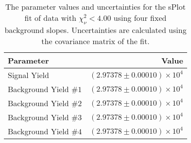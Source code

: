 
\begin{table}[ht]
    \begin{center}
        \begin{tabular}{lr}\toprule
            Parameter & Value \\\midrule
            Signal Yield & $(2.97378 \pm 0.00010) \times 10^{4}$ \\
            Background Yield $\#1$ & $(2.97378 \pm 0.00010) \times 10^{4}$ \\
            Background Yield $\#2$ & $(2.97378 \pm 0.00010) \times 10^{4}$ \\
            Background Yield $\#3$ & $(2.97378 \pm 0.00010) \times 10^{4}$ \\
            Background Yield $\#4$ & $(2.97378 \pm 0.00010) \times 10^{4}$ \\\bottomrule
        \end{tabular}
        \caption{The parameter values and uncertainties for the sPlot fit of data with $\chi^2_\nu < 4.00$ using four fixed background slopes. Uncertainties are calculated using the covariance matrix of the fit.}\label{tab:splot-fit-results-chisqdof-4.00-fixed-4}
    \end{center}
\end{table}
